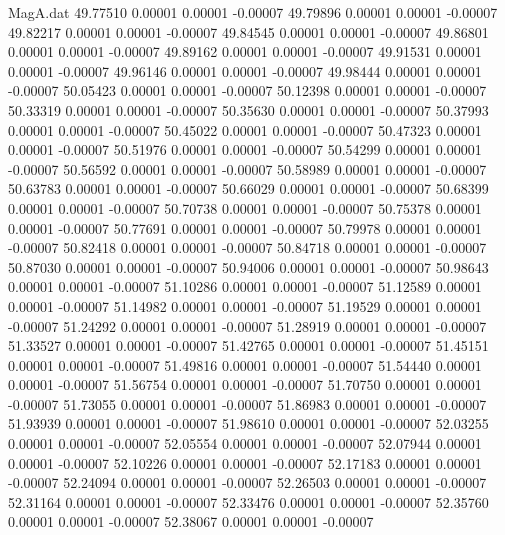 \begin{filecontents}{MagA.dat}
  49.77510    0.00001    0.00001   -0.00007
  49.79896    0.00001    0.00001   -0.00007
  49.82217    0.00001    0.00001   -0.00007
  49.84545    0.00001    0.00001   -0.00007
  49.86801    0.00001    0.00001   -0.00007
  49.89162    0.00001    0.00001   -0.00007
  49.91531    0.00001    0.00001   -0.00007
  49.96146    0.00001    0.00001   -0.00007
  49.98444    0.00001    0.00001   -0.00007
  50.05423    0.00001    0.00001   -0.00007
  50.12398    0.00001    0.00001   -0.00007
  50.33319    0.00001    0.00001   -0.00007
  50.35630    0.00001    0.00001   -0.00007
  50.37993    0.00001    0.00001   -0.00007
  50.45022    0.00001    0.00001   -0.00007
  50.47323    0.00001    0.00001   -0.00007
  50.51976    0.00001    0.00001   -0.00007
  50.54299    0.00001    0.00001   -0.00007
  50.56592    0.00001    0.00001   -0.00007
  50.58989    0.00001    0.00001   -0.00007
  50.63783    0.00001    0.00001   -0.00007
  50.66029    0.00001    0.00001   -0.00007
  50.68399    0.00001    0.00001   -0.00007
  50.70738    0.00001    0.00001   -0.00007
  50.75378    0.00001    0.00001   -0.00007
  50.77691    0.00001    0.00001   -0.00007
  50.79978    0.00001    0.00001   -0.00007
  50.82418    0.00001    0.00001   -0.00007
  50.84718    0.00001    0.00001   -0.00007
  50.87030    0.00001    0.00001   -0.00007
  50.94006    0.00001    0.00001   -0.00007
  50.98643    0.00001    0.00001   -0.00007
  51.10286    0.00001    0.00001   -0.00007
  51.12589    0.00001    0.00001   -0.00007
  51.14982    0.00001    0.00001   -0.00007
  51.19529    0.00001    0.00001   -0.00007
  51.24292    0.00001    0.00001   -0.00007
  51.28919    0.00001    0.00001   -0.00007
  51.33527    0.00001    0.00001   -0.00007
  51.42765    0.00001    0.00001   -0.00007
  51.45151    0.00001    0.00001   -0.00007
  51.49816    0.00001    0.00001   -0.00007
  51.54440    0.00001    0.00001   -0.00007
  51.56754    0.00001    0.00001   -0.00007
  51.70750    0.00001    0.00001   -0.00007
  51.73055    0.00001    0.00001   -0.00007
  51.86983    0.00001    0.00001   -0.00007
  51.93939    0.00001    0.00001   -0.00007
  51.98610    0.00001    0.00001   -0.00007
  52.03255    0.00001    0.00001   -0.00007
  52.05554    0.00001    0.00001   -0.00007
  52.07944    0.00001    0.00001   -0.00007
  52.10226    0.00001    0.00001   -0.00007
  52.17183    0.00001    0.00001   -0.00007
  52.24094    0.00001    0.00001   -0.00007
  52.26503    0.00001    0.00001   -0.00007
  52.31164    0.00001    0.00001   -0.00007
  52.33476    0.00001    0.00001   -0.00007
  52.35760    0.00001    0.00001   -0.00007
  52.38067    0.00001    0.00001   -0.00007

\end{filecontents}
